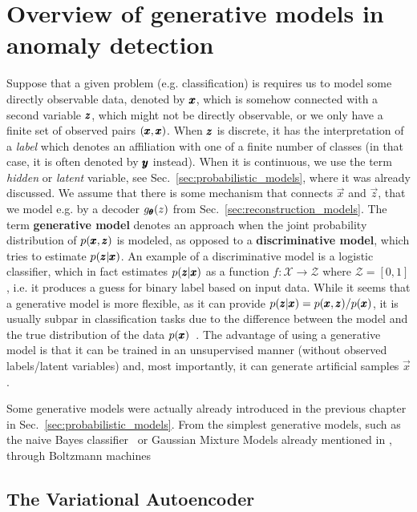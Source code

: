 \chapter{Overview of generative models in anomaly detection} \label{sec:chapter_survey}
Suppose that a given problem (e.g. classification) is requires us to model some directly observable data, denoted by $\pmb{{x}}$, which is somehow connected with a second variable $\pmb{{z}}$, which might not be directly observable, or we only have a finite set of observed pairs $(\pmb{{x}},\pmb{{x}})$. When $\pmb{{z}}$ is discrete, it has the interpretation of a \textit{label} which denotes an affiliation with one of a finite number of classes (in that case, it is often denoted by $\pmb{{y}}$ instead). When it is continuous, we use the term \textit{hidden} or \textit{latent} variable, see Sec.~\ref{sec:probabilistic_models}, where it was already discussed. We assume that there is some mechanism that connects $\vec{x}$ and $\vec{z}$, that we model e.g. by a decoder $g_{\pmb{{\theta}}}(z)$ from Sec.~\ref{sec:reconstruction_models}. The term \textbf{generative model} denotes an approach when the joint probability distribution of $p(\pmb{{x}},\pmb{{z}})$ is modeled, as opposed to a \textbf{discriminative model}, which tries to estimate $p(\pmb{{z}} \vert \pmb{{x}})$. An example of a discriminative model is a logistic classifier, which in fact estimates $p(\pmb{{z}} \vert \pmb{{x}})$ as a function $f:\mathcal{X} \rightarrow \mathcal{Z}$ where $\mathcal{Z} = [0,1]$, i.e. it produces a guess for binary label based on input data. While it seems that a generative model is more flexible, as it can provide  $p(\pmb{{z}} \vert \pmb{{x}}) = p(\pmb{{x}},\pmb{{z}})/p(\pmb{{x}})$, it is usually subpar in classification tasks due to the difference between the model and the true distribution of the data $p(\pmb{{x}})$~\cite{ng2001discriminative,bishop2007generative}. The advantage of using a generative model is that it can be trained in an unsupervised manner (without observed labels/latent variables) and, most importantly, it can generate artificial samples $\vec{x}$.

Some generative models were actually already introduced in the previous chapter in Sec.~\ref{sec:probabilistic_models}. From the simplest generative models, such as the naive Bayes classifier~\cite{domingos1997optimality} or Gaussian Mixture Models already mentioned in , through Boltzmann machines
\cite{goodfellow2014gan,kingma2013vae,dinh2014nice}


\section{The Variational Autoencoder}

